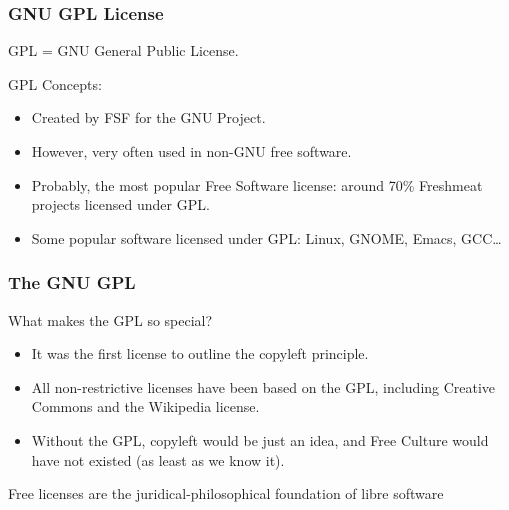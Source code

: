 
\begin{frame}
\frametitle{GNU GPL License}

\begin{center}
\item GPL = GNU General Public License.
\end{center}

GPL Concepts:
\begin{itemize}
\item Created by FSF for the GNU Project.
\item However, very often used in non-GNU free software.
\item Probably, the most popular Free Software license: around 70\%
  Freshmeat projects licensed under GPL.
\item Some popular software licensed under GPL: Linux, GNOME, Emacs,
 GCC\ldots
\end{itemize}

\end{frame}


\begin{frame}
\frametitle{The GNU GPL}
What makes the GPL so special?
\pause
\begin{itemize}
\item It was the first license to outline the copyleft principle.
\item All non-restrictive licenses have been based on the GPL, including Creative Commons and the Wikipedia license.
\item Without the GPL, copyleft would be just an idea, and Free Culture would have not existed (as least as we know it). 
\end{itemize}

\pause
\alert{Free licenses are the juridical-philosophical foundation of libre software}

\end{frame}


